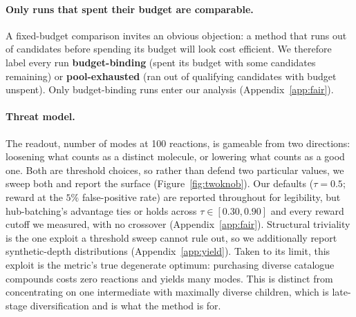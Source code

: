 \documentclass{article}
\newcommand{\checkval}[1]{#1}
\begin{document}
\paragraph{Only runs that spent their budget are comparable.}
A fixed-budget comparison invites an obvious objection: a method that runs out of candidates before spending its budget will look cost efficient. We therefore label every run \textbf{budget-binding} (spent its budget with some candidates remaining) or \textbf{pool-exhausted} (ran out of qualifying candidates with budget unspent). Only budget-binding runs enter our analysis (Appendix~\ref{app:fair}).


\paragraph{Threat model.}
\label{sec:threat}
The readout, number of modes at 100 reactions, is gameable from two directions: loosening what counts as a distinct molecule, or lowering what counts as a good one. Both are threshold choices, so rather than defend two particular values, we sweep both and report the surface (Figure~\ref{fig:twoknob}). Our defaults ($\tau=0.5$; reward at the $5\%$ false-positive rate) are reported throughout for legibility, but hub-batching's advantage ties or holds across $\tau\in[0.30,0.90]$ and every reward cutoff we measured, with no crossover (Appendix~\ref{app:fair}). Structural triviality is the one exploit a threshold sweep cannot rule out, so we additionally report synthetic-depth distributions (Appendix~\ref{app:yield}). Taken to its limit, this exploit is the metric's true degenerate optimum: purchasing diverse catalogue compounds costs zero reactions and yields many modes. This is distinct from concentrating on one intermediate with maximally diverse children, which is late-stage diversification and is what the method is for.
\end{document}

